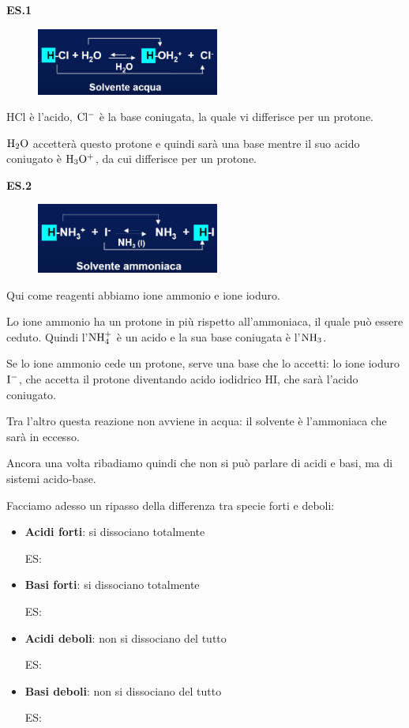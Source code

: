 \vspace{0.2cm}\textbf{ES.1}
\begin{figure}[H]
    \centering
    \includegraphics[width=6cm]{immagini/acido_base_coniugata_es1.png}
\end{figure}

HCl è l'acido, $\rm Cl^-$ è la base coniugata, la quale vi differisce per un protone.

$\rm H_2O$ accetterà questo protone e quindi sarà una base mentre il suo acido coniugato è $\rm H_3O^+$, da cui differisce per un protone.

\vspace{0.2cm}\textbf{ES.2}
\begin{figure}[H]
    \centering
    \includegraphics[width=6cm]{immagini/acido_base_coniugata_es2.png}
\end{figure}

Qui come reagenti abbiamo ione ammonio e ione ioduro.

Lo ione ammonio ha un protone in più rispetto all'ammoniaca, il quale può essere ceduto. Quindi l'$\rm NH_4^+$ è un acido e la sua base coniugata è l'$\rm NH_3$.

Se lo ione ammonio cede un protone, serve una base che lo accetti: lo ione ioduro $\rm I^-$, che accetta il protone diventando acido iodidrico HI, che sarà l'acido coniugato.

Tra l'altro questa reazione non avviene in acqua: il solvente è l'ammoniaca che sarà in eccesso.

Ancora una volta ribadiamo quindi che non si può parlare di acidi e basi, ma di sistemi acido-base.

\vspace{0.2cm}Facciamo adesso un ripasso della differenza tra specie forti e deboli:

\begin{itemize}
    \item \textbf{Acidi forti}: si dissociano totalmente
    
    ES: 
    \item \textbf{Basi forti}: si dissociano totalmente
    
    ES: 
    \item \textbf{Acidi deboli}: non si dissociano del tutto
    
    ES: 
    \item \textbf{Basi deboli}: non si dissociano del tutto
    
    ES: 
\end{itemize}

